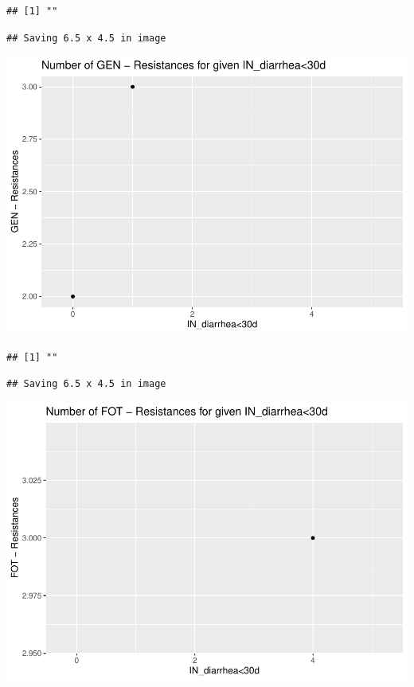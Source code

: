 \documentclass[
]{article}
\begin{document}
\begin{verbatim}
## [1] ""
\end{verbatim}

\begin{verbatim}
## Saving 6.5 x 4.5 in image
\end{verbatim}

\includegraphics{NResistenzen_files/figure-latex/numerical_variables-34.pdf}

\begin{verbatim}
## [1] ""
\end{verbatim}

\begin{verbatim}
## Saving 6.5 x 4.5 in image
\end{verbatim}

\includegraphics{NResistenzen_files/figure-latex/numerical_variables-35.pdf}
\end{document}
